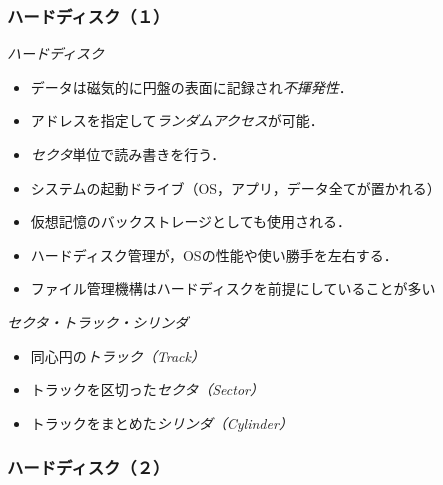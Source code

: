 \documentclass[unicode,handout]{beamer}                   %
\begin{document}
\begin{frame}
  \frametitle{ハードディスク（１）}
  \emph{ハードディスク}
  \begin{itemize}
  \item データは磁気的に円盤の表面に記録され\emph{不揮発性}．
  \item アドレスを指定して\emph{ランダムアクセス}が可能．
  \item \emph{セクタ}単位で読み書きを行う．
  \item システムの起動ドライブ（OS，アプリ，データ全てが置かれる）
  \item 仮想記憶のバックストレージとしても使用される．
  \item ハードディスク管理が，OSの性能や使い勝手を左右する．
  \item ファイル管理機構はハードディスクを前提にしていることが多い
  \end{itemize}
  \vfill
  \emph{セクタ・トラック・シリンダ}
  \begin{itemize}
  \item 同心円の\emph{トラック（Track）}
  \item トラックを区切った\emph{セクタ（Sector）}
  \item トラックをまとめた\emph{シリンダ（Cylinder）}
  \end{itemize}
\end{frame}

\begin{frame}
  \frametitle{ハードディスク（２）}
\end{frame}
\end{document}
